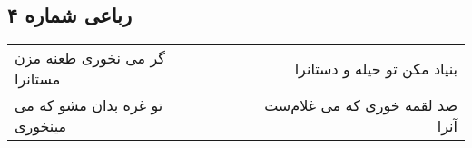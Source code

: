 \begin{center}
\section*{رباعی شماره ۴}
\label{sec:sh004}
\begin{longtable}{l p{0.5cm} r}
گر می نخوری طعنه مزن مستانرا
&&
بنیاد مکن تو حیله و دستانرا
\\
تو غره بدان مشو که می مینخوری
&&
صد لقمه خوری که می غلام‌ست آنرا
\\
\end{longtable}
\end{center}
